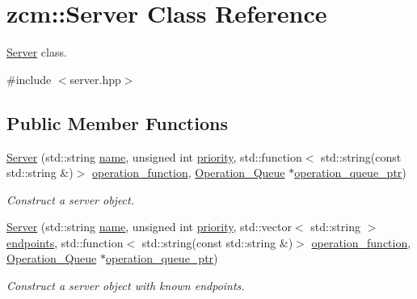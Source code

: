 \hypertarget{classzcm_1_1Server}{}\section{zcm\+:\+:Server Class Reference}
\label{classzcm_1_1Server}


\hyperlink{classzcm_1_1Server}{Server} class.  




{\ttfamily \#include $<$server.\+hpp$>$}

\subsection*{Public Member Functions}
\begin{DoxyCompactItemize}
\item 
\hyperlink{classzcm_1_1Server_ab5026e5eebdcf7c5bbfe00dc4cd4f202}{Server} (std\+::string \hyperlink{classzcm_1_1Server_a9d59737b196a7abb3a891dc8723e0dcf}{name}, unsigned int \hyperlink{classzcm_1_1Server_ad088a068dc025ff7aa4bf560cc7c43c1}{priority}, std\+::function$<$ std\+::string(const std\+::string \&)$>$ \hyperlink{classzcm_1_1Server_a287609eb19370fe01adf47f26633ce01}{operation\+\_\+function}, \hyperlink{classzcm_1_1Operation__Queue}{Operation\+\_\+\+Queue} $\ast$\hyperlink{classzcm_1_1Server_a667c0fef537aa6acc6245d956250c860}{operation\+\_\+queue\+\_\+ptr})
\begin{DoxyCompactList}\small\item\em Construct a server object. \end{DoxyCompactList}\item 
\hyperlink{classzcm_1_1Server_a79dae6a2cac7751c71e11a53ec506a8c}{Server} (std\+::string \hyperlink{classzcm_1_1Server_a9d59737b196a7abb3a891dc8723e0dcf}{name}, unsigned int \hyperlink{classzcm_1_1Server_ad088a068dc025ff7aa4bf560cc7c43c1}{priority}, std\+::vector$<$ std\+::string $>$ \hyperlink{classzcm_1_1Server_a488d1398b76851565a4d116f7cf72af1}{endpoints}, std\+::function$<$ std\+::string(const std\+::string \&)$>$ \hyperlink{classzcm_1_1Server_a287609eb19370fe01adf47f26633ce01}{operation\+\_\+function}, \hyperlink{classzcm_1_1Operation__Queue}{Operation\+\_\+\+Queue} $\ast$\hyperlink{classzcm_1_1Server_a667c0fef537aa6acc6245d956250c860}{operation\+\_\+queue\+\_\+ptr})
\begin{DoxyCompactList}\small\item\em Construct a server object with known endpoints. \end{DoxyCompactList}\item 

\end{DoxyCompactItemize}
